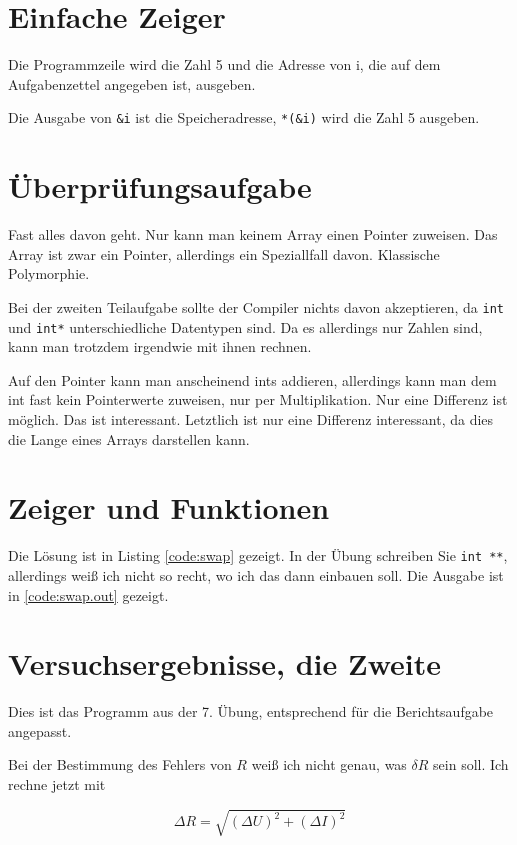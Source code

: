 \section{Einfache Zeiger}

Die Programmzeile wird die Zahl 5 und die Adresse von i, die auf dem Aufgabenzettel angegeben ist, ausgeben.

Die Ausgabe von \verb#&i# ist die Speicheradresse, \verb#*(&i)# wird die Zahl 5 ausgeben.

\section{Überprüfungsaufgabe}

Fast alles davon geht. Nur kann man keinem Array einen Pointer zuweisen. Das Array ist zwar ein Pointer, allerdings ein Speziallfall davon. Klassische Polymorphie.

Bei der zweiten Teilaufgabe sollte der Compiler nichts davon akzeptieren, da \texttt{int} und \texttt{int*} unterschiedliche Datentypen sind. Da es allerdings nur Zahlen sind, kann man trotzdem irgendwie mit ihnen rechnen.

Auf den Pointer kann man anscheinend ints addieren, allerdings kann man dem int fast kein Pointerwerte zuweisen, nur per Multiplikation. Nur eine Differenz ist möglich. Das ist interessant. Letztlich ist nur eine Differenz interessant, da dies die Lange eines Arrays darstellen kann.

\section{Zeiger und Funktionen}

Die Lösung ist in Listing \ref{code:swap} gezeigt. In der Übung schreiben Sie \texttt{int **}, allerdings weiß ich nicht so recht, wo ich das dann einbauen soll. Die Ausgabe ist in \ref{code:swap.out} gezeigt.


\section{Versuchsergebnisse, die Zweite}

Dies ist das Programm aus der 7. Übung, entsprechend für die Berichtsaufgabe angepasst.

Bei der Bestimmung des Fehlers von $R$ weiß ich nicht genau, was $\delta R$ sein soll. Ich rechne jetzt mit

\begin{equation}
\Delta R = \sqrt{(\Delta U)^2 + (\Delta I)^2}
\end{equation}

